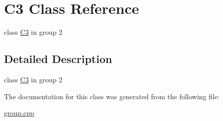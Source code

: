 \hypertarget{classC3}{\section{C3 Class Reference}
\label{classC3}
}


class \hyperlink{classC3}{C3} in group 2  




\subsection{Detailed Description}
class \hyperlink{classC3}{C3} in group 2 

The documentation for this class was generated from the following file\-:\begin{DoxyCompactItemize}
\item 
\hyperlink{group_8cpp}{group.\-cpp}\end{DoxyCompactItemize}

